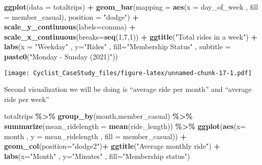 \documentclass[
]{article}
\newenvironment{Shaded}{\begin{snugshade}}{\end{snugshade}}
\newcommand{\AttributeTok}[1]{\textcolor[rgb]{0.13,0.29,0.53}{#1}}
\newcommand{\DecValTok}[1]{\textcolor[rgb]{0.00,0.00,0.81}{#1}}
\newcommand{\FunctionTok}[1]{\textcolor[rgb]{0.13,0.29,0.53}{\textbf{#1}}}
\newcommand{\NormalTok}[1]{#1}
\newcommand{\SpecialCharTok}[1]{\textcolor[rgb]{0.81,0.36,0.00}{\textbf{#1}}}
\newcommand{\StringTok}[1]{\textcolor[rgb]{0.31,0.60,0.02}{#1}}
\begin{document}
\begin{Shaded}
\begin{Highlighting}[]
\FunctionTok{ggplot}\NormalTok{(}\AttributeTok{data =}\NormalTok{ totaltrips) }\SpecialCharTok{+} \FunctionTok{geom\_bar}\NormalTok{(}\AttributeTok{mapping =} \FunctionTok{aes}\NormalTok{(}\AttributeTok{x =}\NormalTok{ day\_of\_week , }\AttributeTok{fill =}\NormalTok{ member\_casual), }\AttributeTok{position =} \StringTok{"dodge"}\NormalTok{) }\SpecialCharTok{+} \FunctionTok{scale\_y\_continuous}\NormalTok{(}\AttributeTok{labels=}\NormalTok{comma) }\SpecialCharTok{+} \FunctionTok{scale\_x\_continuous}\NormalTok{(}\AttributeTok{breaks=}\FunctionTok{seq}\NormalTok{(}\DecValTok{1}\NormalTok{,}\DecValTok{7}\NormalTok{,}\DecValTok{1}\NormalTok{))  }\SpecialCharTok{+} \FunctionTok{ggtitle}\NormalTok{(}\StringTok{"Total rides in a week"}\NormalTok{) }\SpecialCharTok{+} \FunctionTok{labs}\NormalTok{(}\AttributeTok{x =} \StringTok{"Weekday"}\NormalTok{ , }\AttributeTok{y=}\StringTok{"Rides"}\NormalTok{ , }\AttributeTok{fill=}\StringTok{"Membership Status"}\NormalTok{ , }\AttributeTok{subtitle =} \FunctionTok{paste0}\NormalTok{(}\StringTok{"Monday {-} Sunday (2021)"}\NormalTok{))}
\end{Highlighting}
\end{Shaded}

\texttt{[image: Cyclist\_CaseStudy\_files/figure-latex/unnamed-chunk-17-1.pdf]}

Second visualization we will be doing is ``average ride per month'' and
``average ride per week''

\begin{Shaded}
\begin{Highlighting}[]
\NormalTok{totaltrips }\SpecialCharTok{\%\textgreater{}\%} \FunctionTok{group\_by}\NormalTok{(month,member\_casual) }\SpecialCharTok{\%\textgreater{}\%} \FunctionTok{summarize}\NormalTok{(}\AttributeTok{mean\_ridelength =} \FunctionTok{mean}\NormalTok{(ride\_length)) }\SpecialCharTok{\%\textgreater{}\%} \FunctionTok{ggplot}\NormalTok{(}\FunctionTok{aes}\NormalTok{(}\AttributeTok{x=}\NormalTok{ month , }\AttributeTok{y =}\NormalTok{ mean\_ridelength , }\AttributeTok{fill =}\NormalTok{ member\_casual)) }\SpecialCharTok{+} \FunctionTok{geom\_col}\NormalTok{(}\AttributeTok{position=}\StringTok{"dodge2"}\NormalTok{)}\SpecialCharTok{+} \FunctionTok{ggtitle}\NormalTok{(}\StringTok{"Average monthly ride"}\NormalTok{) }\SpecialCharTok{+} \FunctionTok{labs}\NormalTok{(}\AttributeTok{x=}\StringTok{"Month"}\NormalTok{ , }\AttributeTok{y=}\StringTok{"Minutes"}\NormalTok{ , }\AttributeTok{fill=}\StringTok{"Membership status"}\NormalTok{)}
\end{Highlighting}
\end{Shaded}
\end{document}
